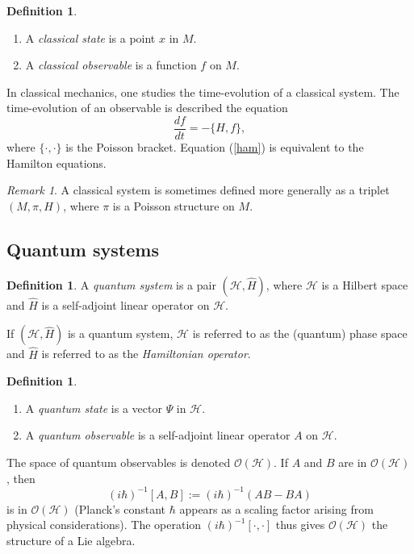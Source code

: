 \documentclass[12pt]{article}
\theoremstyle{definition}
\newtheorem{dfn}[thm]{Definition}
\theoremstyle{remark}
\newtheorem*{rmk}{Remark}
\begin{document}
\begin{dfn}
\begin{enumerate}
\item A \emph{classical state} is a point $x$ in $M$.
\item A \emph{classical observable} is a function $f$ on $M$.
\end{enumerate}
\end{dfn}

In classical mechanics, one studies the time-evolution of a classical system.  The time-evolution of an observable is described the equation
\begin{equation}\label{ham}
\frac{df}{dt} = -\{H,f\},
\end{equation}
where $\{\cdot, \cdot\}$ is the Poisson bracket.  Equation (\ref{ham}) is equivalent to the Hamilton equations.

\begin{rmk}
A classical system is sometimes defined more generally as a triplet $(M, \pi, H)$, where $\pi$ is a Poisson structure on $M$.  
\end{rmk}

\subsection*{Quantum systems}

\begin{dfn}A \emph{quantum system} is a pair $(\mathcal{H}, \hat{H})$, where $\mathcal{H}$ is a Hilbert space and $\hat{H}$ is a self-adjoint linear operator on $\mathcal{H}$.
\end{dfn}

If $(\mathcal{H}, \hat{H})$ is a quantum system, $\mathcal{H}$ is referred to as the (quantum) phase space and $\hat{H}$ is referred to as the \emph{Hamiltonian operator}.

\begin{dfn}
\begin{enumerate}
\item A \emph{quantum state} is a vector $\Psi$ in $\mathcal{H}$.
\item A \emph{quantum observable} is a self-adjoint linear operator $A$ on $\mathcal{H}$.
\end{enumerate}
\end{dfn}

The space of quantum observables is denoted $\mathcal{O}(\mathcal{H})$.  If $A$ and $B$ are in $\mathcal{O}(\mathcal{H})$, then 
\begin{equation}\label{salie}
(i\hbar)^{-1}[A,B] := (i\hbar)^{-1}(AB - BA)
\end{equation}
is in $\mathcal{O}(\mathcal{H})$ (Planck's constant $\hbar$ appears as a scaling factor arising from physical considerations).  The operation $(i\hbar)^{-1}[\cdot,\cdot]$ thus gives $\mathcal{O}(\mathcal{H})$ the structure of a Lie algebra.
\end{document}
